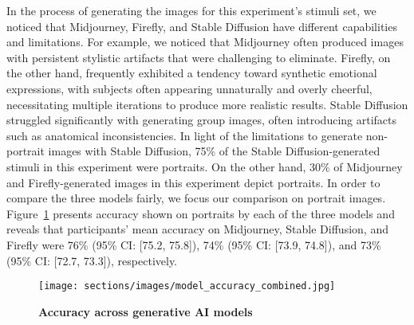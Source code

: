 In the process of generating the images for this experiment's stimuli set, we noticed that Midjourney, Firefly, and Stable Diffusion have different capabilities and limitations. For example, we noticed that Midjourney often produced images with persistent stylistic artifacts that were challenging to eliminate. Firefly, on the other hand, frequently exhibited a tendency toward synthetic emotional expressions, with subjects often appearing unnaturally and overly cheerful, necessitating multiple iterations to produce more realistic results. Stable Diffusion struggled significantly with generating group images, often introducing artifacts such as anatomical inconsistencies. In light of the limitations to generate non-portrait images with Stable Diffusion, 75\% of the Stable Diffusion-generated stimuli in this experiment were portraits. On the other hand, 30\% of Midjourney and Firefly-generated images in this experiment depict portraits. In order to compare the three models fairly, we focus our comparison on portrait images. Figure~\ref{fig:models} presents accuracy shown on portraits by each of the three models and reveals that participants' mean accuracy on Midjourney, Stable Diffusion, and Firefly were  76\% (95\% CI: [75.2, 75.8]), 74\% (95\% CI: [73.9, 74.8]), and 73\% (95\% CI: [72.7, 73.3]), respectively. 


\begin{figure}[H]
    \centering
    \texttt{[image: sections/images/model\_accuracy\_combined.jpg]} 
    \caption{\textbf{Accuracy across generative AI models} }
    \label{fig:models}
\end{figure}


